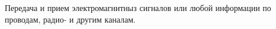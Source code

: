 Передача и прием электромагнитныз сигналов или 
любой информации по проводам, радио- и другим каналам.